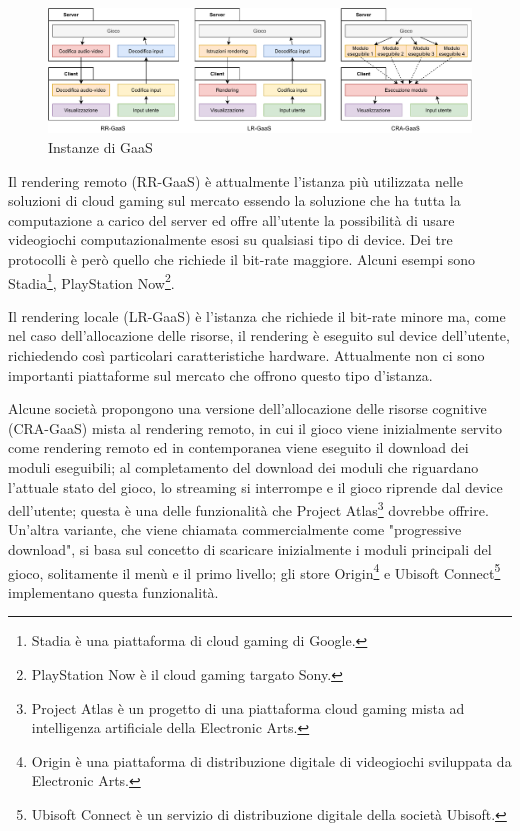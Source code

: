 \begin{figure}[H]
	\includegraphics[width=\linewidth]{immagini/GaaS}
	\caption{Instanze di GaaS}
	\label{fig:GaaS}
\end{figure}

Il rendering remoto (RR-GaaS) è attualmente l'istanza più utilizzata nelle soluzioni di cloud gaming sul mercato essendo la soluzione che ha tutta la computazione a carico del server ed offre all'utente la possibilità di usare videogiochi computazionalmente esosi su qualsiasi tipo di device. Dei tre protocolli è però quello che richiede il bit-rate maggiore. Alcuni esempi sono Stadia\footnote{Stadia è una piattaforma di cloud gaming di Google.}, PlayStation Now\footnote{PlayStation Now è il cloud gaming targato Sony.}.

Il rendering locale (LR-GaaS) è l'istanza che richiede il bit-rate minore ma, come nel caso dell'allocazione delle risorse, il rendering è eseguito sul device dell'utente, richiedendo così particolari caratteristiche hardware. Attualmente non ci sono importanti piattaforme sul mercato che offrono questo tipo d'istanza.

Alcune società propongono una versione dell'allocazione delle risorse cognitive (CRA-GaaS) mista al rendering remoto, in cui il gioco viene inizialmente servito come rendering remoto ed in contemporanea viene eseguito il download dei moduli eseguibili; al completamento del download dei moduli che riguardano l'attuale stato del gioco, lo streaming si interrompe e il gioco riprende dal device dell'utente; questa è una delle funzionalità che Project Atlas\footnote{Project Atlas è un progetto di una piattaforma cloud gaming mista ad intelligenza artificiale della Electronic Arts.} dovrebbe offrire. Un'altra variante, che viene chiamata commercialmente come "progressive download", si basa sul concetto di scaricare inizialmente i moduli principali del gioco, solitamente il menù e il primo livello; gli store Origin\footnote{Origin è una piattaforma di distribuzione digitale di videogiochi sviluppata da Electronic Arts.} e Ubisoft Connect\footnote{Ubisoft Connect è un servizio di distribuzione digitale della società Ubisoft.} implementano questa funzionalità.

